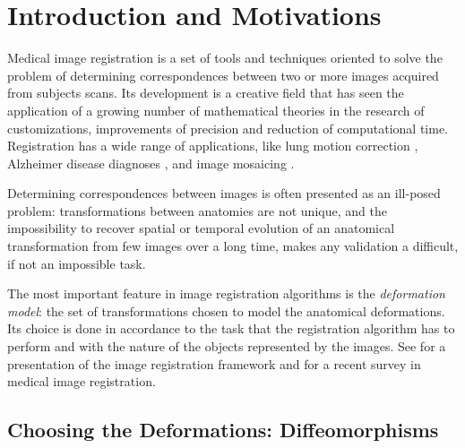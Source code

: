 \chapter{Introduction and Motivations}\label{ch:introduction}


%


Medical image registration is a set of tools and techniques oriented to solve the problem of determining correspondences between two or more images acquired from subjects scans. Its development is a creative field that has seen the application of a growing number of mathematical theories in the research of customizations, improvements of precision and reduction of computational time. Registration has a wide range of applications, like lung motion correction \cite{mcclelland,mcclelland2011inter}, Alzheimer disease diagnoses \cite{prados2015measuring, fox1997brain, gauthier2012prevention}, and image mosaicing \cite{vercauteren2006robust, szeliski1994image}.  

Determining correspondences between images is often presented as an ill-posed problem: transformations between anatomies are not unique, and the impossibility to recover spatial or temporal evolution of an anatomical transformation from few images over a long time, makes any validation a difficult, if not an impossible task. 

The most important feature in image registration algorithms is the \emph{deformation model}: the set of transformations chosen to model the anatomical deformations. Its choice is done in accordance to the task that the registration algorithm has to perform and with the nature of the objects represented by the images. See \cite{ibanez2003itk} for a presentation of the image registration framework and \cite{Sotiras:survey:13} for a recent survey in medical image registration. 

\section{Choosing the Deformations: Diffeomorphisms}

